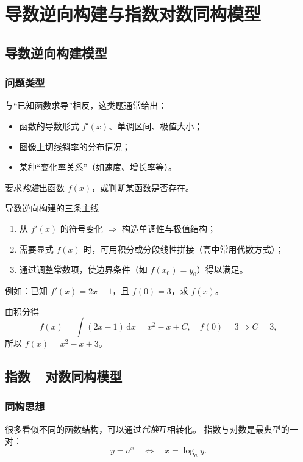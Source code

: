 \documentclass[a4paper,11pt]{ctexart}
\begin{document}
\section{导数逆向构建与指数对数同构模型}

\subsection{导数逆向构建模型}

\subsubsection{问题类型}

与“已知函数求导”相反，这类题通常给出：
\begin{itemize}
  \item 函数的导数形式 $f'(x)$、单调区间、极值大小；
  \item 图像上切线斜率的分布情况；
  \item 某种“变化率关系”（如速度、增长率等）。
\end{itemize}
要求\emph{构造}出函数 $f(x)$，或判断某函数是否存在。

\begin{summarybox}{导数逆向构建的三条主线}
  \begin{enumerate}
    \item 从 $f'(x)$ 的符号变化 $\Rightarrow$ 构造单调性与极值结构；
    \item 需要显式 $f(x)$ 时，可用积分或分段线性拼接（高中常用代数方式）；
    \item 通过调整常数项，使边界条件（如 $f(x_0)=y_0$）得以满足。
  \end{enumerate}
\end{summarybox}

例如：已知 $f'(x)=2x-1$，且 $f(0)=3$，求 $f(x)$。

由积分得
\[
  f(x)=\int(2x-1)\,\mathrm{d}x=x^2-x+C,\quad f(0)=3\Rightarrow C=3,
\]
所以 $f(x)=x^2-x+3$。

\subsection{指数—对数同构模型}

\subsubsection{同构思想}

很多看似不同的函数结构，可以通过\emph{代换}互相转化。
指数与对数是最典型的一对：
\[
  y=a^x \quad\Longleftrightarrow\quad x=\log_a y.
\]
\end{document}
